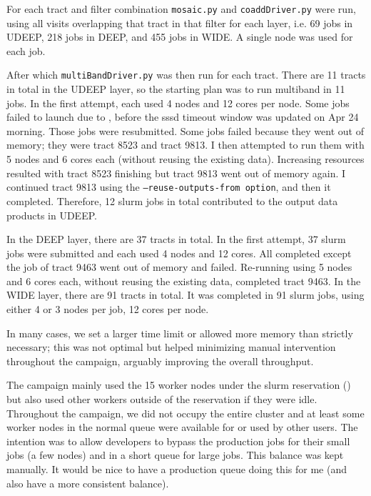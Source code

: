 For each tract and filter combination \texttt{mosaic.py} and \texttt{coaddDriver.py} were run, using all visits overlapping that tract in that filter for each layer, i.e. 69 jobs in UDEEP, 218 jobs in DEEP, and 455 jobs in WIDE.
A single node was used for each job.

After which \texttt{multiBandDriver.py} was then run for each tract.  There are 11 tracts in total in the UDEEP layer, so the starting plan was to run multiband in 11 jobs.
In the first attempt, each used 4 nodes and 12 cores per node.
Some jobs failed to launch due to , before the sssd timeout window was updated on Apr 24 morning.
Those jobs were resubmitted.
Some jobs failed because they went out of memory; they were tract 8523 and tract 9813.
I then attempted to run them with 5 nodes and 6 cores each (without reusing the existing data).
Increasing resources resulted with tract 8523 finishing but tract 9813 went out of memory again.
I continued tract 9813 using the \texttt{--reuse-outputs-from option}, and then it completed.
Therefore, 12 slurm jobs in total contributed to the output data products in UDEEP.


In the DEEP layer, there are 37 tracts in total.
In the first attempt, 37 slurm jobs were submitted and each used 4 nodes and 12 cores.
All completed except the job of tract 9463 went out of memory and failed.
Re-running using 5 nodes and 6 cores each, without reusing the existing data, completed tract 9463.
In the WIDE layer, there are 91 tracts in total.
It was completed in 91 slurm jobs, using either 4 or 3 nodes per job, 12 cores per node.

In many cases, we set a larger time limit or allowed more memory than strictly necessary; this was not optimal but helped minimizing manual intervention throughout the campaign, arguably improving the overall throughput.

The campaign mainly used the 15 worker nodes under the slurm reservation () but also used other workers outside of the reservation if they were idle.
Throughout the campaign, we did not occupy the entire cluster and at least some worker nodes in the normal queue were available for or used by other users.
The intention was to allow developers to bypass the production jobs for their small jobs (a few nodes) and in a short queue for large jobs.
This balance was kept manually.
 It would be nice to have a production queue doing this for me (and also have a more consistent balance).

